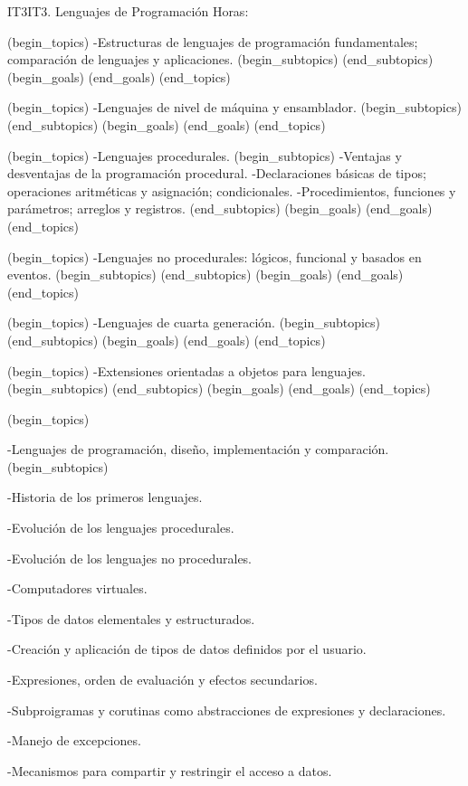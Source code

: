 \begin{BKL2}{IT3}{IT3. Lenguajes de Programación}
Horas:
 
(begin_topics)
-Estructuras de lenguajes de programación fundamentales; comparación de lenguajes y aplicaciones.
(begin_subtopics)
(end_subtopics)
(begin_goals)
(end_goals)
(end_topics)

 
(begin_topics)
-Lenguajes de nivel de máquina y ensamblador.
(begin_subtopics)
(end_subtopics)
(begin_goals)
(end_goals)
(end_topics)

 
(begin_topics)
-Lenguajes procedurales.
(begin_subtopics)
-Ventajas y desventajas de la programación procedural.
-Declaraciones básicas de tipos; operaciones aritméticas y asignación; condicionales.
-Procedimientos, funciones y parámetros; arreglos y registros.
(end_subtopics)
(begin_goals)
(end_goals)
(end_topics)

 
(begin_topics)
-Lenguajes no procedurales: lógicos, funcional y basados en eventos.
(begin_subtopics)
(end_subtopics)
(begin_goals)
(end_goals)
(end_topics)

 
(begin_topics)
-Lenguajes de cuarta generación.
(begin_subtopics)
(end_subtopics)
(begin_goals)
(end_goals)
(end_topics)

 

(begin_topics)
-Extensiones orientadas a objetos para lenguajes.
(begin_subtopics)
(end_subtopics)
(begin_goals)
(end_goals)
(end_topics)

 

(begin_topics)

-Lenguajes de programación, diseño, implementación y comparación.
(begin_subtopics)

-Historia de los primeros lenguajes.

-Evolución de los lenguajes procedurales.

-Evolución de los lenguajes no procedurales.

-Computadores virtuales.

-Tipos de datos elementales y estructurados.

-Creación y aplicación de tipos de datos definidos por el usuario.

-Expresiones, orden de evaluación y efectos secundarios.

-Subproigramas y corutinas como abstracciones de expresiones y declaraciones.

-Manejo de excepciones.

-Mecanismos para compartir y restringir el acceso a datos.


\end{BKL2}
